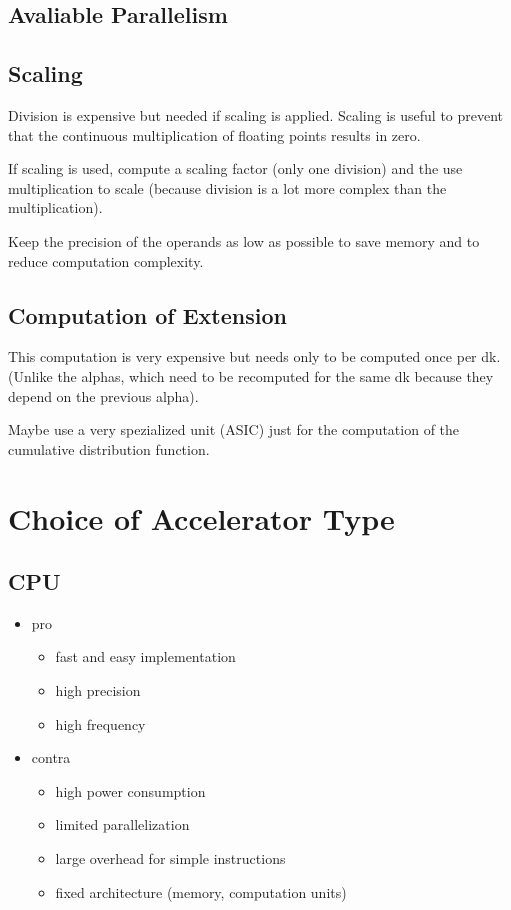 \documentclass[mscthesis]{usiinfthesis}
\begin{document}
\subsection{Avaliable Parallelism}

\subsection{Scaling}
Division is expensive but needed if scaling is applied. Scaling is useful to
prevent that the continuous multiplication of floating points results in zero.

If scaling is used, compute a scaling factor (only one division) and the use
multiplication to scale (because division is a lot more complex than the
multiplication).

Keep the precision of the operands as low as possible to save memory and to
reduce computation complexity.

\subsection{Computation of Extension}
This computation is very expensive but needs only to be computed once per dk.
(Unlike the alphas, which need to be recomputed for the same dk because they
depend on the previous alpha).

Maybe use a very spezialized unit (ASIC) just for the computation of the
cumulative distribution function.

\section{Choice of Accelerator Type}
\label{ch:acc_choice}

\subsection{CPU}
\begin{itemize}
    \item pro
    \begin{itemize}
        \item fast and easy implementation
        \item high precision
        \item high frequency
    \end{itemize}
    \item contra
    \begin{itemize}
        \item high power consumption
        \item limited parallelization
        \item large overhead for simple instructions
        \item fixed architecture (memory, computation units)
    \end{itemize}
\end{itemize}
\end{document}
